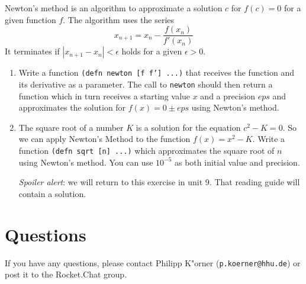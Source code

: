 \documentclass[11pt,a4paper]{article}
\begin{document}
\begin{exercise}
Newton's method is an algorithm to approximate a solution $c$ for $f(c)=0$ for a given function $f$.
The algorithm uses the series $$x_{n+1} = x_{n} - \frac{f(x_n)}{f'(x_n)}$$
It terminates if  $|x_{n+1} - x_n| < \epsilon$ holds for a given $\epsilon > 0$.

\begin{enumerate}[label=\alph*)]

  \item Write a function \texttt{(defn newton [f f'] ...)} that receives the function and its derivative as a parameter. The call to \texttt{newton} should then return a function which in turn receives a starting value $x$ and a precision $eps$ and approximates the solution for $f(x)=0 \pm eps$ using Newton's method.
  
   \item The square root of a number $K$ is a solution for the equation $c^2 - K = 0$. So we can apply Newton's Method to the function $f(x) = x^2 - K$. Write a function \texttt{(defn sqrt [n] ...)} which approximates the square root of $n$ using Newton's method. You can use $10^{-5}$ as both initial value and precision.
    


\emph{Spoiler alert}: we will return to this exercise in unit 9.
That reading guide will contain a solution.

\end{enumerate}
\end{exercise}

	\section*{Questions}
	If you have any questions, please contact Philipp K"orner (\texttt{p.koerner@hhu.de}) or post it to the Rocket.Chat group.
\end{document}
